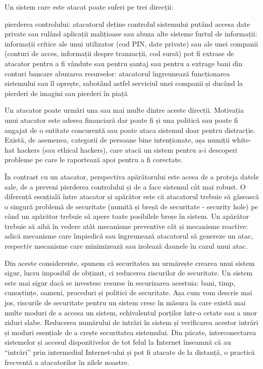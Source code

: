 Un sistem care este atacat poate suferi pe trei direcții:

pierderea controlului: atacatorul deține controlul sistemului putând accesa date private sau rulând aplicații malițioase sau abuza alte sisteme
furtul de informații: informații critice ale unui utilizator (cod PIN, date private) sau ale unei companii (conturi de acces, informații despre tranzacții, cod sursă) pot fi extrase de atacator pentru a fi vândute sau pentru șantaj sau pentru a extrage bani din conturi bancare
abuzarea resurselor: atacatorul îngreunează funcționarea sistemului sau îl oprește, sabotând astfel serviciul unei companii și ducând la pierderi de imagini sau pierderi în piață

Un atacator poate urmări una sau mai multe dintre aceste direcții. Motivația unui atacator este adesea financiară dar poate fi și una politică sau poate fi angajat de o entitate concurentă sau poate ataca sistemul doar pentru distracție. Există, de asemenea, categorii de persoane bine intenționate, așa numiții white-hat hackers (sau ethical hackers), care atacă un sistem pentru a-i descoperi probleme pe care le raportează apoi pentru a fi corectate.

În contrast cu un atacator, perspectiva apărătorului este aceea de a proteja datele sale, de a preveni pierderea controlului și de a face sistemul cât mai robust. O diferență esențială între atacator și apărător este că atacatorul trebuie să găsească o singură problemă de securitate (numită și breșă de securitate - security hole) pe când un apărător trebuie să apere toate posibilele breșe în sistem. Un apărător trebuie să aibă în vedere atât mecanisme preventive cât și mecanisme reactive: adică mecanisme care împiedică sau îngreunează atacatorul să genereze un atac, respectiv mecanisme care minimizează sau izolează daunele în cazul unui atac.

Din aceste considerente, spunem că securitatea nu urmărește crearea unui sistem sigur, lucru imposibil de obținut, ci reducerea riscurilor de securitate. Un sistem este mai sigur dacă se investesc resurse în securizarea acestuia: bani, timp, cunoștințe, oameni, proceduri și politici de securitate. Așa cum vom descrie mai jos, riscurile de securitate pentru un sistem cresc în măsura în care există mai multe moduri de a accesa un sistem, echivalentul porților într-o cetate sau a unor ziduri slabe. Reducerea numărului de intrări în sistem și verificarea acestor intrări și moduri esențiale de a crește securitatea sistemului. Din păcate, interconectarea sistemelor și accesul dispozitivelor de tot felul la Internet înseamnă că au “intrări” prin intermediul Internet-ului și pot fi atacate de la distanță, o practică frecventă a atacatorilor în zilele noastre.

